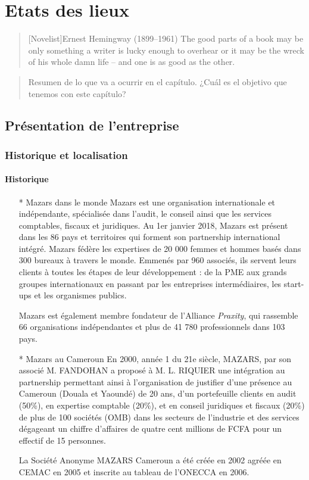 \chapter{Etats des lieux}

\begin{quotation}[Novelist]{Ernest Hemingway (1899--1961)}
The good parts of a book may be only something a writer is lucky enough to overhear or it may be the wreck of his whole damn life -- and one is as good as the other.
\end{quotation}

\begin{abstract}
Resumen de lo que va a ocurrir en el capítulo. ¿Cuál es el objetivo que tenemos con este capítulo?
\end{abstract}

\section{Présentation de l'entreprise}
\subsection{Historique et localisation}
\subsubsection{Historique}
\begin{itemize}
    \item[*] Mazars dans le monde
    Mazars est une organisation internationale et indépendante, spécialisée dans l’audit, le conseil ainsi que les services comptables, fiscaux et juridiques. Au 1er janvier 2018, Mazars est présent dans les 86 pays et territoires qui forment son partnership international intégré. Mazars fédère les expertises de 20 000 femmes et hommes basés dans 300 bureaux à travers le monde. Emmenés par 960 associés, ils servent leurs clients à toutes les étapes de leur développement : de la PME aux grands groupes internationaux en passant par les entreprises intermédiaires, les start-ups et les organismes publics.
    
    Mazars est également membre fondateur de l’Alliance \textit{Praxity}, qui rassemble 66 organisations indépendantes et plus de 41 780 professionnels dans 103 pays.

    \item[*] Mazars au Cameroun
    En 2000, année 1 du 21e siècle, MAZARS, par son associé M. FANDOHAN a proposé à M. L. RIQUIER une intégration au partnership permettant ainsi à l’organisation de justifier d’une présence au Cameroun (Douala et Yaoundé) de 20 ans, d’un portefeuille clients en audit (50\%), en expertise comptable (20\%), et en conseil juridiques et fiscaux (20\%) de plus de 100 sociétés (OMB) dans les secteurs de l’industrie et des services dégageant un chiffre d’affaires de quatre cent millions de FCFA pour un effectif de 15 personnes.
    
    La Société Anonyme MAZARS Cameroun a été créée en 2002 agréée en CEMAC en 2005 et inscrite au tableau de l’ONECCA en 2006.
\end{itemize}
